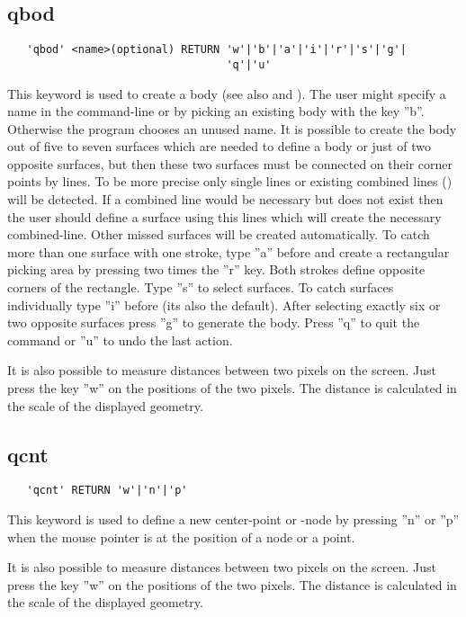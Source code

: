 \documentclass{article}
\begin{document}
\subsection{\label{qbod}qbod}
\begin{verbatim}
   'qbod' <name>(optional) RETURN 'w'|'b'|'a'|'i'|'r'|'s'|'g'|
                                  'q'|'u'
\end{verbatim}
This keyword is used to create a body (see also  and ). The user might specify a name in the command-line or by picking an existing body with the key ''b''. Otherwise the program chooses an unused name. It is possible to create the body out of five to seven surfaces which are needed to define a body or just of two opposite surfaces, but then these two surfaces must be connected on their corner points by lines. To be more precise only single lines or existing combined lines () will be detected. If a combined line would be necessary but does not exist then the user should define a surface using this lines which will create the necessary combined-line. Other missed surfaces will be created automatically. To catch more than one surface with one stroke, type ''a'' before and create a rectangular picking area by pressing two times the ''r'' key. Both strokes define opposite corners of the rectangle. Type ''s'' to select surfaces. To catch surfaces individually type ''i'' before (its also the default). After selecting exactly six or two opposite surfaces press ''g'' to generate the body. Press ''q'' to quit the command or ''u'' to undo the last action.

It is also possible to measure distances between two pixels on the screen. Just press the key ''w'' on the positions of the two pixels. The distance is calculated in the scale of the displayed geometry.

\subsection{\label{qcnt}qcnt}
\begin{verbatim}
   'qcnt' RETURN 'w'|'n'|'p' 
\end{verbatim}
This keyword is used to define a new center-point or -node by pressing ''n'' or ''p'' when the mouse pointer is at the position of a node or a point.
 
It is also possible to measure distances between two pixels on the screen. Just press the key ''w'' on the positions of the two pixels. The distance is calculated in the scale of the displayed geometry.
\end{document}
